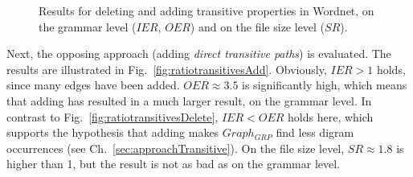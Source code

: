 \begin{figure}[h]
	\centering
	\hfill
	\caption{Results for deleting and adding transitive properties in Wordnet, on the grammar level ($IER$, $OER$) and on the file size level ($SR$).}
	\label{}
\end{figure}

Next, the opposing approach (adding \textit{direct transitive paths}) is evaluated. The results are illustrated in Fig.~\ref{fig:ratiotransitivesAdd}. Obviously, $ IER>1 $ holds, since many edges have been added. $OER\approx3.5$ is significantly high, which means that adding \dtps has resulted in a much larger result, on the grammar level. In contrast to Fig.~\ref{fig:ratiotransitivesDelete}, $IER<OER$ holds here, which supports the hypothesis that adding \dtps makes $Graph_{GRP}$ find less digram occurrences (see Ch.~\ref{sec:approachTransitive}). On the file size level, $SR\approx1.8$ is higher than 1, but the result is not as bad as on the grammar level. 

